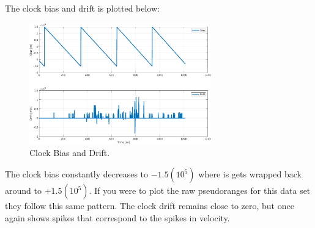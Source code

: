 \documentclass[11pt]{article}
\begin{document}
\begin{enumerate}[label=\textbf{\arabic*.}]
  The clock bias and drift is plotted below:
  \begin{figure}[H]
    \centering
    \includegraphics[width=0.7\textwidth]{dynamic_clock.png}
    \caption{Clock Bias and Drift.}
  \end{figure}
  The clock bias constantly decreases to $-1.5(10^5)$ where is gets wrapped back 
  around to $+1.5(10^5)$. If you were to plot the raw pseudoranges for this data 
  set they follow this same pattern. The clock drift remains close to zero, but 
  once again shows spikes that correspond to the spikes in velocity.


\end{enumerate}
\end{document}
